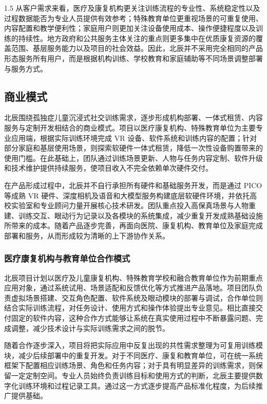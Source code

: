 \documentclass[zihao=-4]{ctexart}
\begin{document}
\begin{spacing}{1.5}
从客户需求来看，医疗及康复机构更关注训练流程的专业性、系统稳定性以及过程数据能否为专业人员提供有效参考；特殊教育单位更重视场景的可重复使用、内容配置和教学便利性；家庭用户则更加关注设备使用成本、操作便捷程度以及训练的持续性。地方政府和公共服务主体关注的重点则更多集中在优质康复资源的覆盖范围、基层服务能力以及项目的社会效益。因此，北辰并不采用完全相同的产品形态服务所有用户，而是根据机构训练、学校教育和家庭辅助等不同场景调整部署与服务方式。

\subsection{商业模式}

北辰围绕孤独症儿童沉浸式社交训练需求，逐步形成机构部署、一体式租赁、内容服务与定制开发相结合的商业模式。项目以医疗康复机构、特殊教育单位为主要专业应用端，根据实际训练环境完成 VR 设备、软件系统和训练内容的配置；针对部分家庭和基层使用场景，则探索软硬件一体式租赁，降低一次性设备购置带来的使用门槛。在此基础上，团队通过训练场景更新、人物与任务内容定制、软件升级和技术维护提供持续服务，使项目收入不完全依赖单次硬件交付。

在产品形成过程中，北辰并不自行承担所有硬件和基础服务开发，而是通过 PICO 等成熟 VR 硬件、深度相机及语音和大模型服务构建底层软硬件环境，并依托高校实验室和专业顾问力量开展核心技术研发。团队重点投入高保真场景与人物重建、训练交互、眼动行为记录以及各模块的系统集成，减少重复开发成熟基础设施所带来的成本。随着产品逐步完善，再面向医院、康复机构、教育单位及家庭完成部署和服务，从而形成较为清晰的上下游协作关系。

\subsubsection{医疗康复机构与教育单位合作模式}

北辰项目计划以医疗及儿童康复机构、特殊教育学校和融合教育单位作为前期重点应用对象，通过系统试用、场景适配和反馈优化等方式推进产品落地。项目团队负责虚拟场景搭建、交互角色配置、软件系统及眼动模块的部署与调试，合作单位则结合实际训练流程，对任务设计、使用方式和操作体验提出专业意见。相比直接交付固定的软件内容，这种合作方式能够让系统在真实使用过程中不断暴露问题、完成调整，减少技术设计与实际训练需求之间的脱节。

随着合作逐步深入，项目将把实际应用中反复出现的共性需求整理为可复用训练模块，减少后续部署中的重复开发。对于不同医疗、康复和教育单位，可在统一系统框架下配置相应训练场景、角色和任务内容；对于具有明显差异的训练需求，则保留一定定制空间。专业人员始终负责训练目标和使用方式的判断，北辰主要提供数字化训练环境和过程记录工具。通过这一方式逐步提高产品标准化程度，为后续推广提供基础。


\end{spacing}
\end{document}

